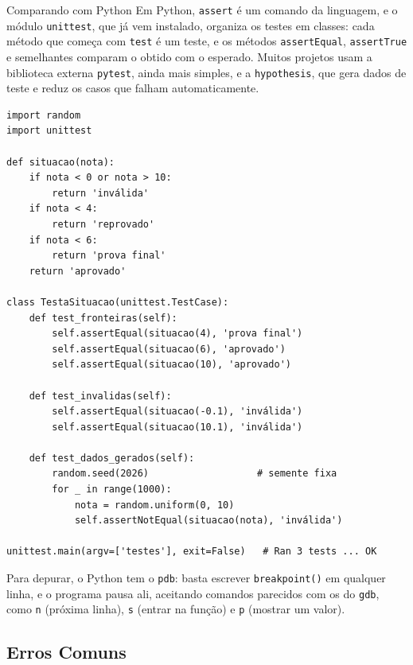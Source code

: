 \begin{destaque}{Comparando com Python}
Em Python, \texttt{assert} é um comando da linguagem, e o módulo \texttt{unittest}, que já vem instalado, organiza os testes em classes: cada método que começa com \texttt{test} é um teste, e os métodos \texttt{assertEqual}, \texttt{assertTrue} e semelhantes comparam o obtido com o esperado. Muitos projetos usam a biblioteca externa \texttt{pytest}, ainda mais simples, e a \texttt{hypothesis}, que gera dados de teste e reduz os casos que falham automaticamente.

\begin{codigo}
\begin{Verbatim}[breaklines=true, breaksymbolleft={}, fontsize=\footnotesize]
import random
import unittest

def situacao(nota):
    if nota < 0 or nota > 10:
        return 'inválida'
    if nota < 4:
        return 'reprovado'
    if nota < 6:
        return 'prova final'
    return 'aprovado'

class TestaSituacao(unittest.TestCase):
    def test_fronteiras(self):
        self.assertEqual(situacao(4), 'prova final')
        self.assertEqual(situacao(6), 'aprovado')
        self.assertEqual(situacao(10), 'aprovado')

    def test_invalidas(self):
        self.assertEqual(situacao(-0.1), 'inválida')
        self.assertEqual(situacao(10.1), 'inválida')

    def test_dados_gerados(self):
        random.seed(2026)                   # semente fixa
        for _ in range(1000):
            nota = random.uniform(0, 10)
            self.assertNotEqual(situacao(nota), 'inválida')

unittest.main(argv=['testes'], exit=False)   # Ran 3 tests ... OK
\end{Verbatim}
\end{codigo}

Para depurar, o Python tem o \texttt{pdb}: basta escrever \texttt{breakpoint()} em qualquer linha, e o programa pausa ali, aceitando comandos parecidos com os do \texttt{gdb}, como \texttt{n} (próxima linha), \texttt{s} (entrar na função) e \texttt{p} (mostrar um valor).
\end{destaque}

\subsection{Erros Comuns}

